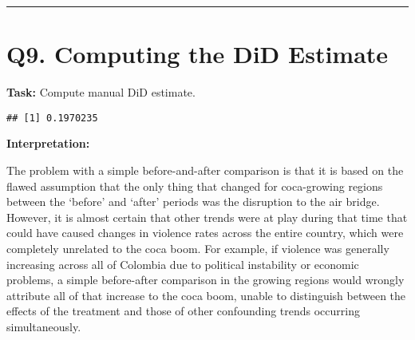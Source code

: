 \documentclass[
]{article}
\newenvironment{Shaded}{\begin{snugshade}}{\end{snugshade}}
\newcommand{\AttributeTok}[1]{\textcolor[rgb]{0.13,0.29,0.53}{#1}}
\newcommand{\CommentTok}[1]{\textcolor[rgb]{0.56,0.35,0.01}{\textit{#1}}}
\newcommand{\ConstantTok}[1]{\textcolor[rgb]{0.56,0.35,0.01}{#1}}
\newcommand{\FunctionTok}[1]{\textcolor[rgb]{0.13,0.29,0.53}{\textbf{#1}}}
\newcommand{\NormalTok}[1]{#1}
\newcommand{\OtherTok}[1]{\textcolor[rgb]{0.56,0.35,0.01}{#1}}
\newcommand{\SpecialCharTok}[1]{\textcolor[rgb]{0.81,0.36,0.00}{\textbf{#1}}}
\newcommand{\StringTok}[1]{\textcolor[rgb]{0.31,0.60,0.02}{#1}}
\begin{document}
\begin{center}\rule{0.5\linewidth}{0.5pt}\end{center}

\section{Q9. Computing the DiD
Estimate}\label{q9.-computing-the-did-estimate}

\textbf{Task:} Compute manual DiD estimate.

\begin{Shaded}
\end{Shaded}

\begin{verbatim}
## [1] 0.1970235
\end{verbatim}

\textbf{Interpretation:}

The problem with a simple before-and-after comparison is that it is
based on the flawed assumption that the only thing that changed for
coca-growing regions between the `before' and `after' periods was the
disruption to the air bridge. However, it is almost certain that other
trends were at play during that time that could have caused changes in
violence rates across the entire country, which were completely
unrelated to the coca boom. For example, if violence was generally
increasing across all of Colombia due to political instability or
economic problems, a simple before-after comparison in the growing
regions would wrongly attribute all of that increase to the coca boom,
unable to distinguish between the effects of the treatment and those of
other confounding trends occurring simultaneously.
\end{document}
